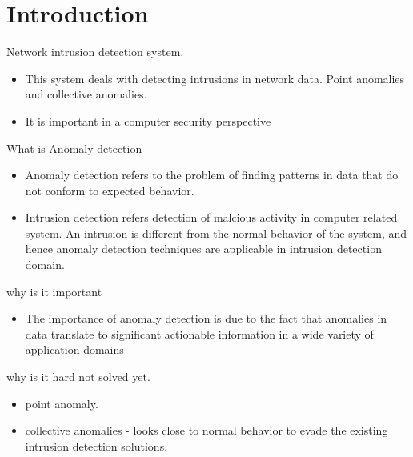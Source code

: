 \section{Introduction}

Network intrusion detection system.

\begin{itemize}
\item This system deals with detecting intrusions in network data. Point anomalies and collective anomalies.
\item It is important in a computer security perspective
\end{itemize}

What is Anomaly detection

\begin{itemize}
\item Anomaly detection refers to the problem of finding patterns in data that do not conform to expected behavior. \cite{chandola09}
\item Intrusion detection refers detection of malcious activity in computer related system. An intrusion is different from the normal behavior of the system, and hence anomaly detection techniques are applicable in intrusion detection domain. \cite{chandola09}
\end{itemize}

why is it important

\begin{itemize}
\item The importance of anomaly detection is due to the fact that anomalies in data translate to significant actionable information in a wide variety of application domains \cite{chandola09}
\end{itemize}

why is it hard not solved yet. \cite{chandola09}

\begin{itemize}
\item point anomaly.
\item collective anomalies - looks close to normal behavior to evade the existing intrusion detection solutions.
\end{itemize}







